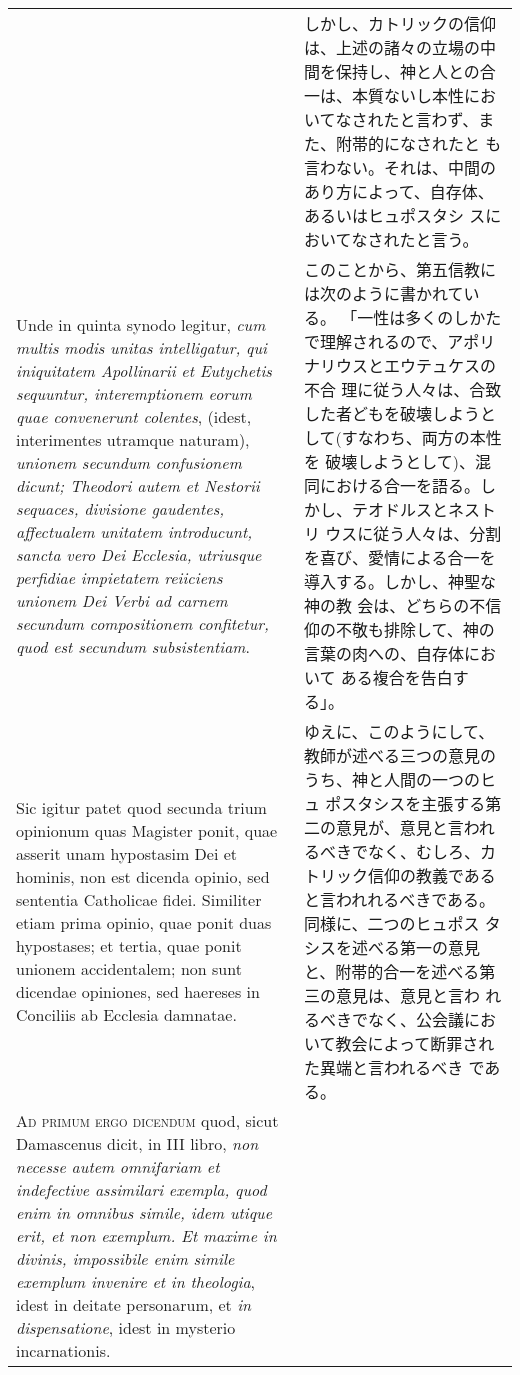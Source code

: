 \documentclass[10pt]{jsarticle} %
\begin{document}
\begin{longtable}{p{21em}p{21em}}
&

しかし、カトリックの信仰は、上述の諸々の立場の中間を保持し、神と人との合
 一は、本質ないし本性においてなされたと言わず、また、附帯的になされたと
 も言わない。それは、中間のあり方によって、自存体、あるいはヒュポスタシ
 スにおいてなされたと言う。

\\

Unde in quinta synodo legitur, {\itshape cum multis modis unitas
intelligatur, qui iniquitatem Apollinarii et Eutychetis sequuntur,
interemptionem eorum quae convenerunt colentes}, (idest, interimentes
utramque naturam), {\itshape unionem secundum confusionem dicunt; Theodori autem
et Nestorii sequaces, divisione gaudentes, affectualem unitatem
introducunt, sancta vero Dei Ecclesia, utriusque perfidiae impietatem
reiiciens unionem Dei Verbi ad carnem secundum compositionem confitetur,
quod est secundum subsistentiam}.

&

このことから、第五信教には次のように書かれている。
「一性は多くのしかたで理解されるので、アポリナリウスとエウテュケスの不合
 理に従う人々は、合致した者どもを破壊しようとして(すなわち、両方の本性を
 破壊しようとして)、混同における合一を語る。しかし、テオドルスとネストリ
 ウスに従う人々は、分割を喜び、愛情による合一を導入する。しかし、神聖な神の教
 会は、どちらの不信仰の不敬も排除して、神の言葉の肉への、自存体において
 ある複合を告白する」。


\\


Sic igitur patet quod secunda trium
opinionum quas Magister ponit, quae asserit unam hypostasim Dei et
hominis, non est dicenda opinio, sed sententia Catholicae
fidei. 
Similiter etiam prima opinio, quae ponit duas hypostases; et
tertia, quae ponit unionem accidentalem; non sunt dicendae opiniones,
sed haereses in Conciliis ab Ecclesia damnatae.


&

ゆえに、このようにして、教師が述べる三つの意見のうち、神と人間の一つのヒュ
 ポスタシスを主張する第二の意見が、意見と言われるべきでなく、むしろ、カ
 トリック信仰の教義であると言われれるべきである。同様に、二つのヒュポス
 タシスを述べる第一の意見と、附帯的合一を述べる第三の意見は、意見と言わ
 れるべきでなく、公会議において教会によって断罪された異端と言われるべき
 である。


\\



{\scshape Ad primum ergo dicendum} quod, sicut Damascenus dicit, in III libro, {\itshape non
necesse autem omnifariam et indefective assimilari exempla, quod enim in
omnibus simile, idem utique erit, et non exemplum. Et maxime in divinis,
impossibile enim simile exemplum invenire et in theologia}, idest in
deitate personarum, et {\itshape in dispensatione}, idest in mysterio
incarnationis. 




\end{longtable}
\end{document}
